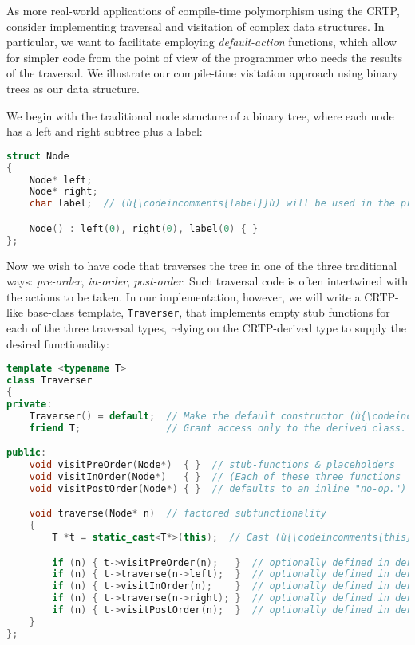 As more real-world applications of compile-time polymorphism using the CRTP,
consider implementing traversal and visitation of complex data
structures. In particular, we want to facilitate employing
\emph{default-action} functions, which allow for simpler code from the
point of view of the programmer who needs the results of the traversal.
We illustrate our compile-time visitation approach using binary trees as
our data structure.

We begin with the traditional node structure of a binary tree, where
each node has a left and right subtree plus a label:

\begin{lstlisting}[language=C++]
struct Node
{
    Node* left;
    Node* right;
    char label;  // (ù{\codeincomments{label}}ù) will be used in the pre-order example.

    Node() : left(0), right(0), label(0) { }
};
\end{lstlisting}
    
\noindent Now we wish to have code that traverses the tree in one of the three
traditional ways: \emph{pre-order}, \emph{in-order}, \emph{post-order}.
Such traversal code is often intertwined with the actions to be taken.
In our implementation, however, we will write a CRTP-like base-class
template, \texttt{Traverser}, that implements empty stub functions for
each of the three traversal types, relying on the CRTP-derived
type to supply the desired functionality:

\begin{lstlisting}[language=C++]
template <typename T>
class Traverser
{
private:
    Traverser() = default;  // Make the default constructor (ù{\codeincomments{private}}ù).
    friend T;               // Grant access only to the derived class.

public:
    void visitPreOrder(Node*)  { }  // stub-functions & placeholders
    void visitInOrder(Node*)   { }  // (Each of these three functions
    void visitPostOrder(Node*) { }  // defaults to an inline "no-op.")

    void traverse(Node* n)  // factored subfunctionality
    {
        T *t = static_cast<T*>(this);  // Cast (ù{\codeincomments{this}}ù) to the derived type.

        if (n) { t->visitPreOrder(n);   }  // optionally defined in derived
        if (n) { t->traverse(n->left);  }  // optionally defined in derived
        if (n) { t->visitInOrder(n);    }  // optionally defined in derived
        if (n) { t->traverse(n->right); }  // optionally defined in derived
        if (n) { t->visitPostOrder(n);  }  // optionally defined in derived
    }
};
\end{lstlisting}
    
